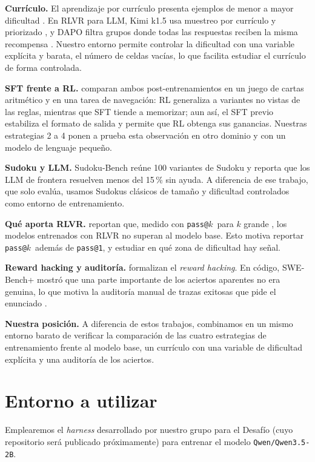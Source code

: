 \documentclass[letterpaper,11pt]{article}
\makeatletter
\newcommand{\passuno}{\texttt{pass@1}}
\newcommand{\passk}{\texttt{pass@}\ensuremath{k}}
\makeatother
\begin{document}
\textbf{Currículo.} El aprendizaje por currículo presenta ejemplos de menor a mayor dificultad \citep{bengio2009curriculum}. En RLVR para LLM, Kimi k1.5 usa muestreo por currículo y priorizado \citep{kimi2025k15}, y DAPO filtra grupos donde todas las respuestas reciben la misma recompensa \citep{yu2025dapo}. Nuestro entorno permite controlar la dificultad con una variable explícita y barata, el número de celdas vacías, lo que facilita estudiar el currículo de forma controlada.

\textbf{SFT frente a RL.} \citet{chu2025sft} comparan ambos post-entrenamientos en un juego de cartas aritmético y en una tarea de navegación: RL generaliza a variantes no vistas de las reglas, mientras que SFT tiende a memorizar; aun así, el SFT previo estabiliza el formato de salida y permite que RL obtenga sus ganancias. Nuestras estrategias 2 a 4 ponen a prueba esta observación en otro dominio y con un modelo de lenguaje pequeño.

\textbf{Sudoku y LLM.} Sudoku-Bench \citep{seely2025sudokubench} reúne 100 variantes de Sudoku y reporta que los LLM de frontera resuelven menos del 15\,\% sin ayuda. A diferencia de ese trabajo, que solo evalúa, usamos Sudokus clásicos de tamaño y dificultad controlados como entorno de entrenamiento.

\textbf{Qué aporta RLVR.} \citet{yue2025limit} reportan que, medido con \passk\ para $k$ grande \citep{chen2021codex}, los modelos entrenados con RLVR no superan al modelo base. Esto motiva reportar \passk\ además de \passuno, y estudiar en qué zona de dificultad hay señal.

\textbf{Reward hacking y auditoría.} \citet{skalse2022reward} formalizan el \emph{reward hacking}. En código, SWE-Bench+ \citep{aleithan2024swebenchplus} mostró que una parte importante de los aciertos aparentes no era genuina, lo que motiva la auditoría manual de trazas exitosas que pide el enunciado \citep{enunciadoproyecto2026}.

\textbf{Nuestra posición.} A diferencia de estos trabajos, combinamos en un mismo entorno barato de verificar la comparación de las cuatro estrategias de entrenamiento frente al modelo base, un currículo con una variable de dificultad explícita y una auditoría de los aciertos.

\section{Entorno a utilizar}
Emplearemos el \emph{harness} desarrollado por nuestro grupo para el Desafío (cuyo repositorio será publicado próximamente) para entrenar el modelo \texttt{Qwen/Qwen3.5-2B}.
\end{document}
